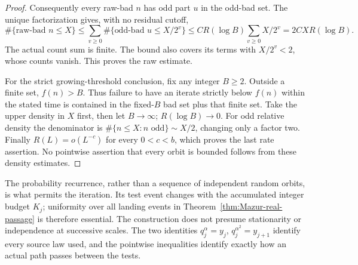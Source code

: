 \begin{proof}
Consequently every raw-bad \(n\) has odd part \(u\) in the odd-bad
set. The unique factorization gives, with no residual cutoff,
\[
 \#\{\text{raw-bad }n\le X\}
 \le\sum_{v\ge0}\#\{\text{odd-bad }u\le X/2^v\}
 \le C R(\log B)\sum_{v\ge0}X/2^v
 =2CX R(\log B).
\]
The actual count sum is finite. The bound also covers its terms with
\(X/2^v<2\), whose counts vanish. This proves the raw estimate.

For the strict growing-threshold conclusion, fix any integer \(B\ge2\).
Outside a finite set, \(f(n)>B\). Thus failure to have an iterate
strictly below \(f(n)\) within the stated time is contained in the
fixed-\(B\) bad set plus that finite set. Take the upper density in
\(X\) first, then let \(B\to\infty\); \(R(\log B)\to0\).
For odd relative density the denominator is
\(\#\{n\le X:n\text{ odd}\}\sim X/2\), changing only a factor two.
Finally \(R(L)=o(L^{-c})\) for every \(0<c<b\), which proves the
last rate assertion. No pointwise assertion that every orbit is
bounded follows from these density estimates.
\end{proof}

The probability recurrence, rather than a sequence of independent
random orbits, is what permits the iteration. Its test event changes
with the accumulated integer budget \(K_j\); uniformity over all
landing events in Theorem~\ref{thm:Mazur-real-passage} is therefore
essential. The construction does not presume stationarity or
independence at successive scales. The two identities
\(q_j^\alpha=y_j\), \(q_j^{\alpha^2}=y_{j+1}\) identify every source
law used, and the pointwise inequalities identify exactly how an
actual path passes between the tests.

\begin{center}
\end{center}
